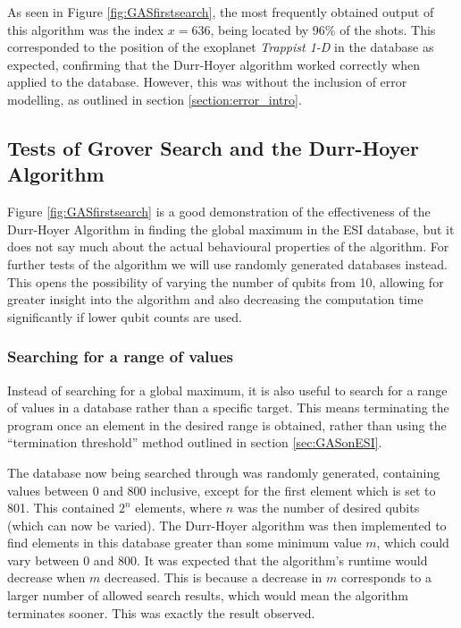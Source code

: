 \documentclass{article}[11pt]
\begin{document}
As seen in Figure \ref{fig:GASfirstsearch}, the most frequently obtained output of this algorithm was the index $x=636$, being located by 96\% of the shots. This corresponded to the position of the exoplanet \textit{Trappist 1-D} in the database as expected, confirming that the Durr-Hoyer algorithm worked correctly when applied to the database. However, this was without the inclusion of error modelling, as outlined in section \ref{section:error_intro}.

\subsection{Tests of Grover Search and the Durr-Hoyer Algorithm}
Figure \ref{fig:GASfirstsearch} is a good demonstration of the effectiveness of the Durr-Hoyer Algorithm in finding the global maximum in the ESI database, but it does not say much about the actual behavioural properties of the algorithm. For further tests of the algorithm we will use randomly generated databases instead. This opens the possibility of varying the number of qubits from 10, allowing for greater insight into the algorithm and also decreasing the computation time significantly if lower qubit counts are used.

\subsubsection{Searching for a range of values}
Instead of searching for a global maximum, it is also useful to search for a range of values in a database rather than a specific target. This means terminating the program once an element in the desired range is obtained, rather than using the ``termination threshold'' method outlined in section \ref{sec:GASonESI}.

The database now being searched through was randomly generated, containing values between 0 and 800 inclusive, except for the first element which is set to 801. This contained $2^n$ elements, where $n$ was the number of desired qubits (which can now be varied). The Durr-Hoyer algorithm was then implemented to find elements in this database greater than some minimum value $m$, which could vary between 0 and 800. It was expected that the algorithm's runtime would decrease when $m$ decreased. This is because a decrease in $m$ corresponds to a larger number of allowed search results, which would mean the algorithm terminates sooner. This was exactly the result observed.
\end{document}
